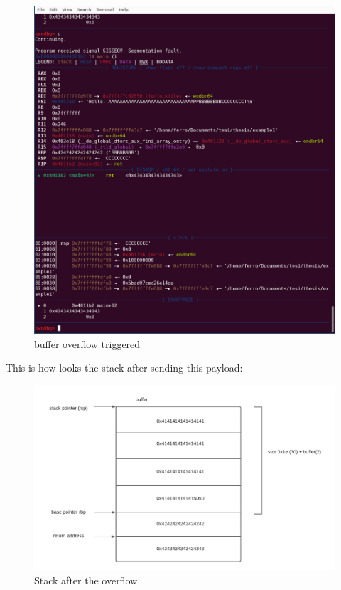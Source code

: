 \documentclass{report}
\begin{document}
    \begin{figure}[h]
        \centering
        \includegraphics[width=0.9\linewidth]{example1.png}
        \caption{buffer overflow triggered}
        \label{fig:empty stack}
    \end{figure}
    \newpage
    
    This is how looks the stack after sending this payload:
    \begin{figure}[htbp]
        \centering
        \includegraphics[width=1\linewidth]{stack_after_overflow.png}
        \caption{Stack after the overflow}
        \label{fig:stack w overflow}
    \end{figure}
    \clearpage
\end{document}
